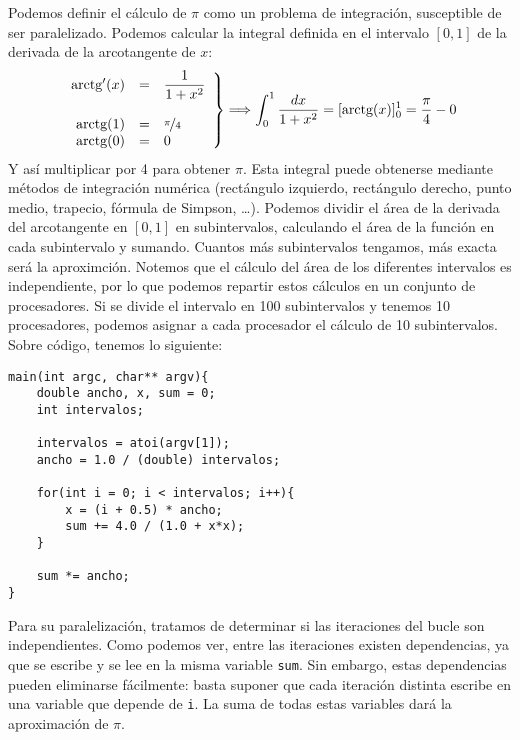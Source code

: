 Podemos definir el cálculo de $\pi$ como un problema de integración, susceptible de ser paralelizado. Podemos calcular la integral definida en el intervalo $[0,1]$ de la derivada de la arcotangente de $x$:
\begin{equation*}
    \left.\begin{array}{rcl}
        \text{arctg}'(x) & = & \dfrac{1}{1+x^2} \\
                  & & \\
        \text{arctg}(1) & = & \nicefrac{\pi}{4} \\
        \text{arctg}(0) & = & 0 
    \end{array}\right\} \Longrightarrow \int_{0}^{1} \dfrac{dx}{1+x^2} = [\text{arctg}(x)]_0^1 = \dfrac{\pi}{4} - 0
\end{equation*}
Y así multiplicar por 4 para obtener $\pi$. Esta integral puede obtenerse mediante métodos de integración numérica (rectángulo izquierdo, rectángulo derecho, punto medio, trapecio, fórmula de Simpson, \ldots). Podemos dividir el área de la derivada del arcotangente en $[0,1]$ en subintervalos, calculando el área de la función en cada subintervalo y sumando. Cuantos más subintervalos tengamos, más exacta será la aproximción.
Notemos que el cálculo del área de los diferentes intervalos es independiente, por lo que podemos repartir estos cálculos en un conjunto de procesadores. Si se divide el intervalo en 100 subintervalos y tenemos 10 procesadores, podemos asignar a cada procesador el cálculo de 10 subintervalos. Sobre código, tenemos lo siguiente:
    \begin{verbatim}
main(int argc, char** argv){
    double ancho, x, sum = 0;
    int intervalos;

    intervalos = atoi(argv[1]);
    ancho = 1.0 / (double) intervalos;

    for(int i = 0; i < intervalos; i++){
        x = (i + 0.5) * ancho;
        sum += 4.0 / (1.0 + x*x);
    }

    sum *= ancho;
}
    \end{verbatim}
Para su paralelización, tratamos de determinar si las iteraciones del bucle son independientes. Como podemos ver, entre las iteraciones existen dependencias, ya que se escribe y se lee en la misma variable \verb|sum|. Sin embargo, estas dependencias pueden eliminarse fácilmente: basta suponer que cada iteración distinta escribe en una variable que depende de \verb|i|. La suma de todas estas variables dará la aproximación de $\pi$. 

